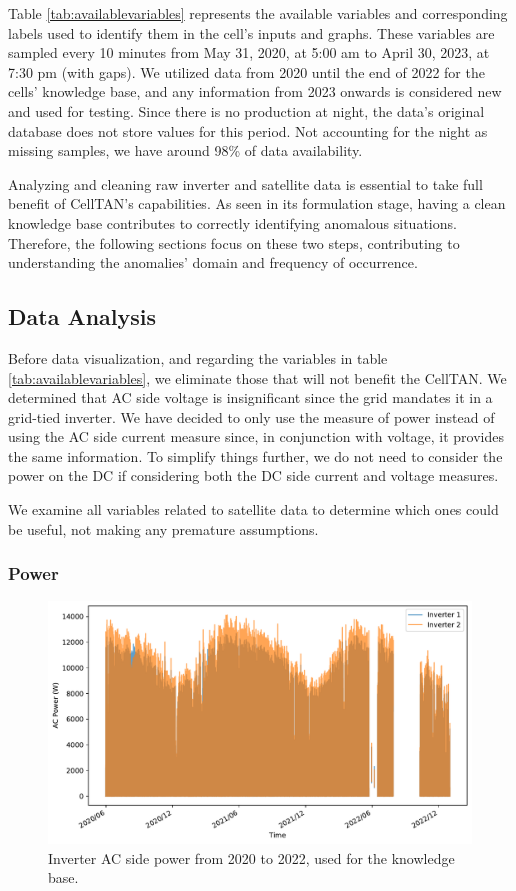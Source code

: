 Table \ref{tab:availablevariables} represents the available variables and corresponding labels used to identify them in the cell's inputs and graphs. These variables are sampled every 10 minutes from May 31, 2020, at 5:00 am to April 30, 2023, at 7:30 pm (with gaps). We utilized data from 2020 until the end of 2022 for the cells' knowledge base, and any information from 2023 onwards is considered new and used for testing. Since there is no production at night, the data's original database does not store values for this period. Not accounting for the night as missing samples, we have around 98\% of data availability.

Analyzing and cleaning raw inverter and satellite data is essential to take full benefit of CellTAN's capabilities. As seen in its formulation stage, having a clean knowledge base contributes to correctly identifying anomalous situations. Therefore, the following sections focus on these two steps, contributing to understanding the anomalies' domain and frequency of occurrence.

\subsection{Data Analysis}

Before data visualization, and regarding the variables in table \ref{tab:availablevariables}, we eliminate those that will not benefit the CellTAN. We determined that AC side voltage is insignificant since the grid mandates it in a grid-tied inverter. We have decided to only use the measure of power instead of using the AC side current measure since, in conjunction with voltage, it provides the same information. To simplify things further, we do not need to consider the power on the DC if considering both the DC side current and voltage measures.

We examine all variables related to satellite data to determine which ones could be useful, not making any premature assumptions.

\subsubsection{Power}


\begin{figure}[h!]
    \centering
    \includegraphics[width=\textwidth]{figures/chapter5/analysis/00_power_kb.pdf}
    \caption{Inverter AC side power from 2020 to 2022, used for the knowledge base.}
    \label{fig:eda_power_kb}
\end{figure}

